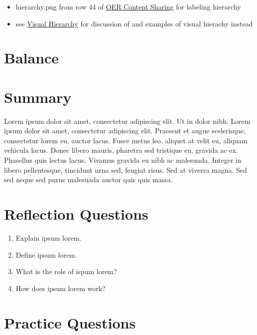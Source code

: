 \documentclass[
]{book}
\providecommand{\tightlist}{%
  \setlength{\itemsep}{0pt}\setlength{\parskip}{0pt}}
\begin{document}
\begin{itemize}
\tightlist
\item
  hierarchy.png from row 44 of \href{https://docs.google.com/spreadsheets/d/1LqzXn00wMeIjHWstNT3tMImNDZirLGc3g72jFOQc_8I/edit\#gid=817407192}{OER Content Sharing} for labeling hierarchy
\item
  see \href{https://www.axismaps.com/guide/visual-hierarchy}{Visual Hierarchy} for discussion of and examples of visual hierachy instead
\end{itemize}

\hypertarget{balance}{%
\section{Balance}\label{balance}}

\hypertarget{summary-12}{%
\section{Summary}\label{summary-12}}

Lorem ipsum dolor sit amet, consectetur adipiscing elit. Ut in dolor nibh. Lorem ipsum dolor sit amet, consectetur adipiscing elit. Praesent et augue scelerisque, consectetur lorem eu, auctor lacus. Fusce metus leo, aliquet at velit eu, aliquam vehicula lacus. Donec libero mauris, pharetra sed tristique eu, gravida ac ex. Phasellus quis lectus lacus. Vivamus gravida eu nibh ac malesuada. Integer in libero pellentesque, tincidunt urna sed, feugiat risus. Sed at viverra magna. Sed sed neque sed purus malesuada auctor quis quis massa.

\hypertarget{reflection-questions-12}{%
\section*{Reflection Questions}\label{reflection-questions-12}}

\begin{enumerate}
\def\labelenumi{\arabic{enumi}.}
\tightlist
\item
  Explain ipsum lorem.
\item
  Define ipsum lorem.
\item
  What is the role of ispum lorem?
\item
  How does ipsum lorem work?
\end{enumerate}

\hypertarget{practice-questions-9}{%
\section*{Practice Questions}\label{practice-questions-9}}
\end{document}

